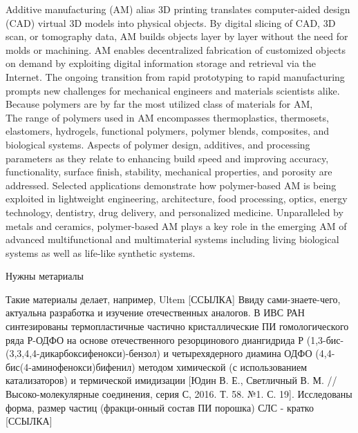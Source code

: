 





Additive manufacturing (AM) alias 3D printing translates computer-aided
design (CAD) virtual 3D models into physical objects. By digital slicing of CAD, 3D scan,
or tomography data, AM builds objects layer by layer without the need for molds or
machining. AM enables decentralized fabrication of customized objects on demand by
exploiting digital information storage and retrieval via the Internet. The ongoing transition
from rapid prototyping to rapid manufacturing prompts new challenges for mechanical
engineers and materials scientists alike. Because polymers are by far the most utilized class
of materials for AM,\\
The
range of polymers used in AM encompasses thermoplastics, thermosets, elastomers,
hydrogels, functional polymers, polymer blends, composites, and biological systems.
Aspects of polymer design, additives, and processing parameters as they relate to enhancing build speed and improving accuracy,
functionality, surface finish, stability, mechanical properties, and porosity are addressed. Selected applications demonstrate how
polymer-based AM is being exploited in lightweight engineering, architecture, food processing, optics, energy technology,
dentistry, drug delivery, and personalized medicine. Unparalleled by metals and ceramics, polymer-based AM plays a key role in
the emerging AM of advanced multifunctional and multimaterial systems including living biological systems as well as life-like
synthetic systems.\\
\cite{3d-review}



Нужны метариалы \cite{sls-material}



Такие материалы делает, например, Ultem [ССЫЛКА] Ввиду сами-знаете-чего, актуальна разработка и изучение отечественных аналогов. В ИВС РАН синтезированы термопластичные частично кристаллические ПИ гомологического ряда Р-ОДФО на основе отечественного резорцинового диангидрида Р (1,3-бис-(3,3,4,4-дикарбоксифенокси)-бензол) и четырехядерного диамина ОДФО (4,4-бис(4-аминофенокси)бифенил) методом химической (с использованием катализаторов) и термической имидизации [Юдин В. Е., Светличный В. М. // Высоко-молекулярные соединения, серия С, 2016. Т. 58. №1. С. 19]. Исследованы форма, размер частиц (фракци-онный состав ПИ порошка) \cite{yudin-red}
СЛС - кратко [ССЫЛКА]

